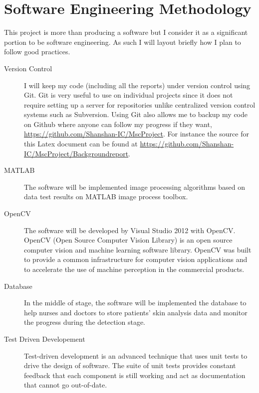 \appendix
\chapter{Software Engineering Methodology} \label{app:sem}
This project is more than producing a software but I consider it as a significant portion to be software engineering.  As such I will layout briefly how I plan to follow good practices. 

\begin{description}

\item[Version Control] I will keep my code (including all the reports) under version control using Git. Git is very useful to use on individual projects since it does not require setting up a server for repositories unlike centralized version control systems such as Subversion. Using Git also allows me to backup my code on Github where anyone can follow my progress if they want, \url{https://github.com/Shanshan-IC/MscProject}. 
For instance the source for this Latex document can be found at \url{https://github.com/Shanshan-IC/MscProject/Backgroundreport}.

\item[MATLAB] The software will be implemented image processing algorithms based on data test results on MATLAB image process toolbox.


\item[OpenCV] The software will be developed by Visual Studio 2012 with OpenCV. OpenCV (Open Source Computer Vision Library) is an open source computer vision and machine learning software library. OpenCV was built to provide a common infrastructure for computer vision applications and to accelerate the use of machine perception in the commercial products.

\item[Database] In the middle of stage, the software will be implemented the database to help nurses and doctors to store patients' skin analysis data and monitor the progress during the detection stage.

\item[Test Driven Developement] Test-driven development is an advanced technique that uses unit tests to drive the design of software. The suite of unit tests provides constant feedback that each component is still working and act as documentation that cannot go out-of-date.

\end{description}

